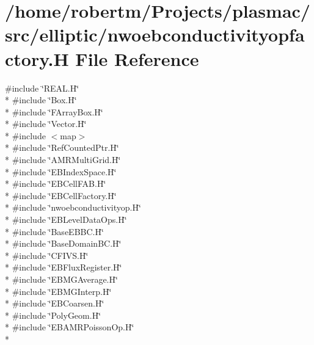 \hypertarget{nwoebconductivityopfactory_8H}{}\section{/home/robertm/\+Projects/plasmac/src/elliptic/nwoebconductivityopfactory.H File Reference}
\label{nwoebconductivityopfactory_8H}
{\ttfamily \#include \char`\"{}R\+E\+A\+L.\+H\char`\"{}}\\*
{\ttfamily \#include \char`\"{}Box.\+H\char`\"{}}\\*
{\ttfamily \#include \char`\"{}F\+Array\+Box.\+H\char`\"{}}\\*
{\ttfamily \#include \char`\"{}Vector.\+H\char`\"{}}\\*
{\ttfamily \#include $<$map$>$}\\*
{\ttfamily \#include \char`\"{}Ref\+Counted\+Ptr.\+H\char`\"{}}\\*
{\ttfamily \#include \char`\"{}A\+M\+R\+Multi\+Grid.\+H\char`\"{}}\\*
{\ttfamily \#include \char`\"{}E\+B\+Index\+Space.\+H\char`\"{}}\\*
{\ttfamily \#include \char`\"{}E\+B\+Cell\+F\+A\+B.\+H\char`\"{}}\\*
{\ttfamily \#include \char`\"{}E\+B\+Cell\+Factory.\+H\char`\"{}}\\*
{\ttfamily \#include \char`\"{}nwoebconductivityop.\+H\char`\"{}}\\*
{\ttfamily \#include \char`\"{}E\+B\+Level\+Data\+Ops.\+H\char`\"{}}\\*
{\ttfamily \#include \char`\"{}Base\+E\+B\+B\+C.\+H\char`\"{}}\\*
{\ttfamily \#include \char`\"{}Base\+Domain\+B\+C.\+H\char`\"{}}\\*
{\ttfamily \#include \char`\"{}C\+F\+I\+V\+S.\+H\char`\"{}}\\*
{\ttfamily \#include \char`\"{}E\+B\+Flux\+Register.\+H\char`\"{}}\\*
{\ttfamily \#include \char`\"{}E\+B\+M\+G\+Average.\+H\char`\"{}}\\*
{\ttfamily \#include \char`\"{}E\+B\+M\+G\+Interp.\+H\char`\"{}}\\*
{\ttfamily \#include \char`\"{}E\+B\+Coarsen.\+H\char`\"{}}\\*
{\ttfamily \#include \char`\"{}Poly\+Geom.\+H\char`\"{}}\\*
{\ttfamily \#include \char`\"{}E\+B\+A\+M\+R\+Poisson\+Op.\+H\char`\"{}}\\*
